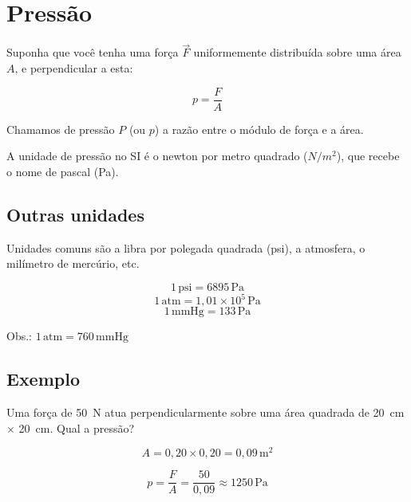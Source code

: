 \documentclass[12pt]{article}
\begin{document}
\section*{Pressão}

Suponha que você tenha uma força $\vec{F}$ uniformemente distribuída sobre uma área $A$, e perpendicular a esta:

\[
p = \frac{F}{A}
\]

Chamamos de pressão $P$ (ou $p$) a razão entre o módulo de força e a área.

A unidade de pressão no SI é o newton por metro quadrado ($\si{N/m^2}$), que recebe o nome de pascal (Pa).

\subsection*{Outras unidades}
Unidades comuns são a libra por polegada quadrada (psi), a atmosfera, o milímetro de mercúrio, etc.

\[
1 \, \text{psi} = 6895 \, \text{Pa}
\]
\[
1 \, \text{atm} = 1{,}01 \times 10^5 \, \text{Pa}
\]
\[
1 \, \text{mmHg} = 133 \, \text{Pa}
\]

Obs.: $1 \, \text{atm} = 760 \, \text{mmHg}$

\subsection*{Exemplo}
Uma força de \SI{50}{N} atua perpendicularmente sobre uma área quadrada de \SI{20}{cm} $\times$ \SI{20}{cm}. Qual a pressão?

\[
A = 0{,}20 \times 0{,}20 = 0{,}09 \, \text{m}^2
\]

\[
p = \frac{F}{A} = \frac{50}{0{,}09} \approx 1250 \, \text{Pa}
\]
\end{document}
